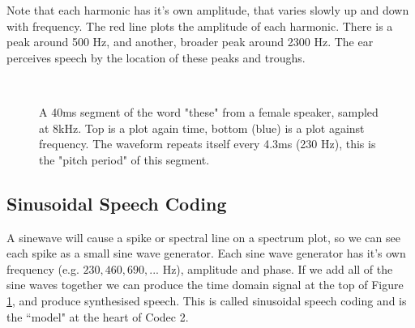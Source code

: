 \documentclass{article}
\begin{document}
Note that each harmonic has it's own amplitude, that varies slowly up and down with frequency.  The red line plots the amplitude of each harmonic. There is a peak around 500 Hz, and another, broader peak around 2300 Hz.  The ear perceives speech by the location of these peaks and troughs.

\begin{figure}[H]
\caption{ A 40ms segment of the word "these" from a female speaker, sampled at 8kHz. Top is a plot again time, bottom (blue) is a plot against frequency. The waveform repeats itself every 4.3ms (230 Hz), this is the "pitch period" of this segment.}
\label{fig:hts2a_time}
\begin{center}

\\

\end{center}
\end{figure}

\subsection{Sinusoidal Speech Coding}

A sinewave will cause a spike or spectral line on a spectrum plot, so we can see each spike as a small sine wave generator.  Each sine wave generator has it's own frequency (e.g. $230, 460, 690,...$ Hz), amplitude and phase.  If we add all of the sine waves together we can produce the time domain signal at the top of Figure \ref{fig:hts2a_time}, and produce synthesised speech.  This is called sinusoidal speech coding and is the ``model" at the heart of Codec 2.
\end{document}
